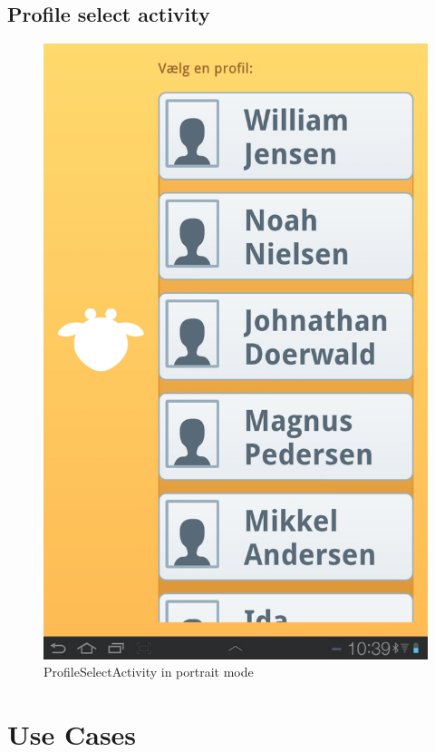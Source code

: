 \section{Profile select activity}
\begin{figure}[h!]
	\centering
	\includegraphics[scale=0.3]{gfx/profile-select-activity_1.jpg}
	\caption{ProfileSelectActivity in portrait mode}
	\label{fig:profile-select-activity_1}
\end{figure}

\chapter{Use Cases}
\label{appendix_use_cases}

